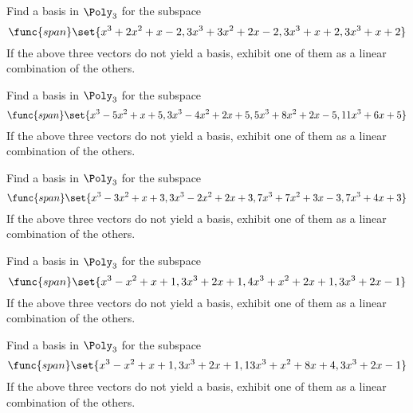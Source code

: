 \begin{enumialphparenastyle}
\begin{ex} Find a basis in $\Poly_{3}$ for the subspace 
\begin{equation*}
\func{span}\set{
x^{3}+2x^{2}+x-2,3x^{3}+3x^{2}+2x-2,3x^{3}+x+2,3x^{3}+x+2}
\end{equation*}
If the above three vectors do not yield a basis, exhibit one of them as a
linear combination of the others.
\end{ex}


\begin{ex} Find a basis in $\Poly_{3}$ for the subspace 
\begin{equation*}
\func{span}\set{
x^{3}-5x^{2}+x+5,3x^{3}-4x^{2}+2x+5,5x^{3}+8x^{2}+2x-5,11x^{3}+6x+5}
\end{equation*}
If the above three vectors do not yield a basis, exhibit one of them as a
linear combination of the others.
\end{ex}


\begin{ex} Find a basis in $\Poly_{3}$ for the subspace 
\begin{equation*}
\func{span}\set{
x^{3}-3x^{2}+x+3,3x^{3}-2x^{2}+2x+3,7x^{3}+7x^{2}+3x-3,7x^{3}+4x+3}
\end{equation*}
If the above three vectors do not yield a basis, exhibit one
of them as a linear combination of the others.
\end{ex}


\begin{ex} Find a basis in $\Poly_{3}$ for the subspace 
\begin{equation*}
\func{span}\set{
x^{3}-x^{2}+x+1,3x^{3}+2x+1,4x^{3}+x^{2}+2x+1,3x^{3}+2x-1}
\end{equation*}
If the above three vectors do not yield a basis, exhibit one
of them as a linear combination of the others.
\end{ex}


\begin{ex} Find a basis in $\Poly_{3}$ for the subspace 
\begin{equation*}
\func{span}\set{
x^{3}-x^{2}+x+1,3x^{3}+2x+1,13x^{3}+x^{2}+8x+4,3x^{3}+2x-1}
\end{equation*}
If the above three vectors do not yield a basis, exhibit one
of them as a linear combination of the others.
\end{ex}



\end{enumialphparenastyle}
